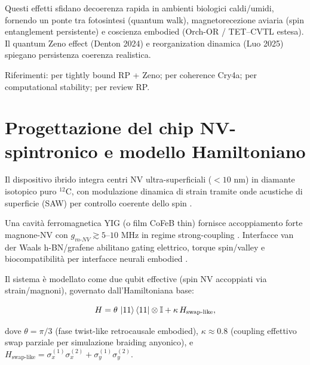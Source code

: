 \documentclass[11pt,a4paper]{article}
\let\oldcite\cite
\renewcommand{\cite}{\protect\oldcite}
\theoremstyle{plain}
\theoremstyle{definition}
\begin{document}
Questi effetti sfidano decoerenza rapida in ambienti biologici caldi/umidi, fornendo un ponte tra fotosintesi (quantum walk), magnetorecezione aviaria (spin entanglement persistente) e coscienza embodied (Orch-OR / TET–CVTL estesa). Il quantum Zeno effect (Denton 2024) e reorganization dinamica (Luo 2025) spiegano persistenza coerenza realistica.

\vspace{0.2cm}


Riferimenti: \cite{Denton2024} per tightly bound RP + Zeno; \cite{Xu2021} per coherence Cry4a; \cite{Luo2025} per computational stability; \cite{Hore2016} per review RP.








\section{Progettazione del chip NV-spintronico e modello Hamiltoniano}
\label{sec:chip-design}

Il dispositivo ibrido integra centri NV ultra-superficiali ($<10$ nm) in diamante isotopico puro $^{12}$C, con modulazione dinamica di strain tramite onde acustiche di superficie (SAW) per controllo coerente dello spin \cite{Teissier2014, Ovartchaiyapong2014}. 

\vspace{0.2cm}

Una cavità ferromagnetica YIG (o film CoFeB thin) fornisce accoppiamento forte magnone-NV con $g_{m\text{-}NV} \gtrsim 5$--$10$ MHz in regime strong-coupling \cite{Xiong2021, Fukami2021, Wu2024}. Interfacce van der Waals h-BN/grafene abilitano gating elettrico, torque spin/valley e biocompatibilità per interfacce neurali embodied \cite{Dolde2011, Meriles2025}.

\vspace{0.2cm}

Il sistema è modellato come due qubit effective (spin NV accoppiati via strain/magnoni), governato dall'Hamiltoniana base:

\begin{equation}
    H = \theta \, \ket{11}\bra{11} \otimes \mathbb{I} + \kappa \, H_{\text{swap-like}},
    \label{eq:base-ham}
\end{equation}

\vspace{0.2cm}

dove $\theta = \pi/3$ (fase twist-like retrocausale embodied), $\kappa \approx 0.8$ (coupling effettivo swap parziale per simulazione braiding anyonico), e $H_{\text{swap-like}} = \sigma_x^{(1)} \sigma_x^{(2)} + \sigma_y^{(1)} \sigma_y^{(2)}$.
\end{document}
